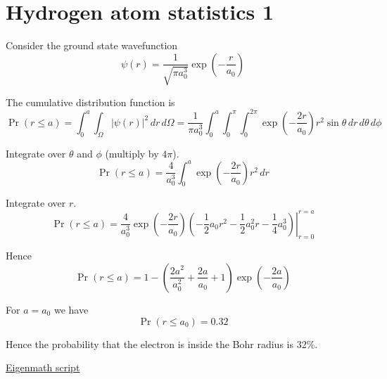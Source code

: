 

\section*{Hydrogen atom statistics 1}

Consider the ground state wavefunction
\begin{equation*}
\psi(r)=\frac{1}{\sqrt{\pi a_0^3}}\exp\left(-\frac{r}{a_0}\right)
\end{equation*}

The cumulative distribution function is
\begin{equation*}
\Pr(r\le a)
=\int_0^a\int_{\Omega}|\psi(r)|^2\,dr\,d\Omega
=\frac{1}{\pi a_0^3}
\int_0^a\int_0^\pi\int_0^{2\pi}\exp\left(-\frac{2r}{a_0}\right)
r^2\sin\theta\,dr\,d\theta\,d\phi
\end{equation*}

Integrate over $\theta$ and $\phi$ (multiply by $4\pi$).
\begin{equation*}
\Pr(r\le a)=\frac{4}{a_0^3}
\int_0^a\exp\left(-\frac{2r}{a_0}\right)r^2\,dr
\end{equation*}

Integrate over $r$.
\begin{equation*}
\Pr(r\le a)=\frac{4}{a_0^3}
\exp\left(-\frac{2r}{a_0}\right)
\left.
\left(-\frac{1}{2}a_0r^2-\frac{1}{2}a_0^2r-\frac{1}{4}a_0^3\right)
\right|_{r=0}^{r=a}
\end{equation*}

Hence
\begin{equation*}
\Pr(r\le a)=1-\left(\frac{2a^2}{a_0^2}+\frac{2a}{a_0}+1\right)
\exp\left(-\frac{2a}{a_0}\right)
\end{equation*}

For $a=a_0$ we have
\begin{equation*}
\Pr(r\le a_0)=0.32
\end{equation*}

Hence the probability that the electron is inside the Bohr radius is 32\%.

\bigskip
\href{https://georgeweigt.github.io/examples/hydrogen-atom-statistics-1-demo.html}{Eigenmath script}



